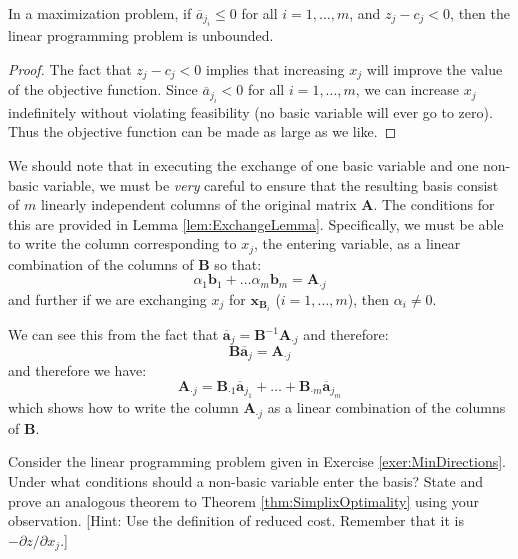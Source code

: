 \begin{theorem} In a maximization problem, if $\overline{a}_{j_i} \leq 0$ for all $i = 1,\dots,m$, and $z_j - c_j < 0$, then the linear programming problem is unbounded.
\label{thm:Unboundedness}
\end{theorem}
\begin{proof} The fact that $z_j - c_j < 0$ implies that increasing $x_j$ will improve the value of the objective function. Since $\overline{a}_{j_i} < 0$ for all $i = 1,\dots,m$, we can increase $x_j$ indefinitely without violating feasibility (no basic variable will ever go to zero). Thus the objective function can be made as large as we like. 
\end{proof}

\begin{remark} We should note that in executing the exchange of one basic variable and one non-basic variable, we must be \textit{very} careful to ensure that the resulting basis consist of $m$ linearly independent columns of the original matrix $\mathbf{A}$. The conditions for this are provided in Lemma \ref{lem:ExchangeLemma}. Specifically, we must be able to write the column corresponding to $x_j$, the entering variable, as a linear combination of the columns of $\mathbf{B}$ so that:
\begin{equation}
\alpha_1\mathbf{b}_1 + \dots \alpha_m\mathbf{b}_m = \mathbf{A}_{\cdot j}
\end{equation}
and further if we are exchanging $x_j$ for $\mathbf{x}_{\mathbf{B}_i}$ ($i=1,\dots,m$), then $\alpha_i \neq 0$.

We can see this from the fact that $\overline{\mathbf{a}}_j = \mathbf{B}^{-1}\mathbf{A}_{\cdot j}$ and therefore:
\begin{displaymath}
\mathbf{B}\overline{\mathbf{a}}_j = \mathbf{A}_{\cdot j}
\end{displaymath}
and therefore we have:
\begin{displaymath}
\mathbf{A}_{\cdot j} = \mathbf{B}_{\cdot 1}\overline{\mathbf{a}}_{j_1} + \dots + 
\mathbf{B}_{\cdot m}\overline{\mathbf{a}}_{j_m}
\end{displaymath}
which shows how to write the column $\mathbf{A}_{\cdot j}$ as a linear combination of the columns of $\mathbf{B}$. 
\end{remark}

\begin{exercise} Consider the linear programming problem given in Exercise \ref{exer:MinDirections}. Under what conditions should a non-basic variable enter the basis? State and prove an analogous theorem to Theorem \ref{thm:SimplixOptimality} using your observation. [Hint: Use the definition of reduced cost. Remember that it is $-\partial z/\partial x_j$.]
\label{exer:MinEnteringVariable}
\end{exercise}

